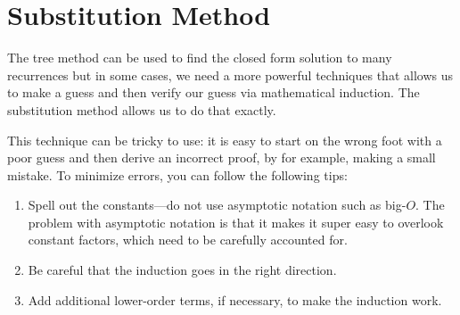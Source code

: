 \section{Substitution Method}
\label{sec:analysis::recurrences::substitution-method}

\begin{gram}
The tree method can be used to find the closed form solution to many
recurrences but in some cases, we need a more powerful techniques that
allows us to make a guess and then verify our guess via mathematical induction.
%
The substitution method allows us to do that exactly.
%
\end{gram}

\begin{important}
This technique can be tricky to use: it is easy to start on the wrong
foot with a poor guess and then derive an incorrect proof, by for example,
making a small mistake.
%
To minimize errors, you can follow the following tips:
\begin{enumerate}
\item Spell out the constants---do not use asymptotic notation such as
  big-$O$.  The problem with asymptotic notation is that it makes it
  super easy to overlook constant factors, which need to be carefully
  accounted for.

\item Be careful that the induction goes in the right direction.

\item Add additional lower-order terms, if necessary, to make the
  induction work.
\end{enumerate}
\end{important}

